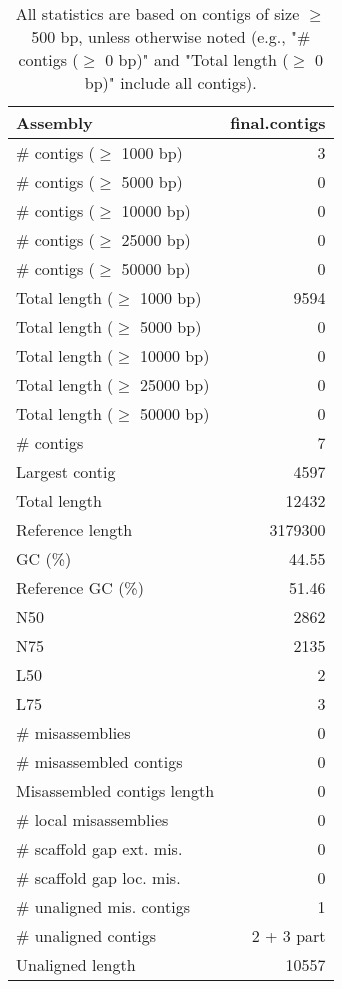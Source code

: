 \documentclass[12pt,a4paper]{article}
\begin{document}
\begin{table}[ht]
\begin{center}
\caption{All statistics are based on contigs of size $\geq$ 500 bp, unless otherwise noted (e.g., "\# contigs ($\geq$ 0 bp)" and "Total length ($\geq$ 0 bp)" include all contigs).}
\begin{tabular}{|l*{1}{|r}|}
\hline
Assembly & final.contigs \\ \hline
\# contigs ($\geq$ 1000 bp) & 3 \\ \hline
\# contigs ($\geq$ 5000 bp) & 0 \\ \hline
\# contigs ($\geq$ 10000 bp) & 0 \\ \hline
\# contigs ($\geq$ 25000 bp) & 0 \\ \hline
\# contigs ($\geq$ 50000 bp) & 0 \\ \hline
Total length ($\geq$ 1000 bp) & 9594 \\ \hline
Total length ($\geq$ 5000 bp) & 0 \\ \hline
Total length ($\geq$ 10000 bp) & 0 \\ \hline
Total length ($\geq$ 25000 bp) & 0 \\ \hline
Total length ($\geq$ 50000 bp) & 0 \\ \hline
\# contigs & 7 \\ \hline
Largest contig & 4597 \\ \hline
Total length & 12432 \\ \hline
Reference length & 3179300 \\ \hline
GC (\%) & 44.55 \\ \hline
Reference GC (\%) & 51.46 \\ \hline
N50 & 2862 \\ \hline
N75 & 2135 \\ \hline
L50 & 2 \\ \hline
L75 & 3 \\ \hline
\# misassemblies & 0 \\ \hline
\# misassembled contigs & 0 \\ \hline
Misassembled contigs length & 0 \\ \hline
\# local misassemblies & 0 \\ \hline
\# scaffold gap ext. mis. & 0 \\ \hline
\# scaffold gap loc. mis. & 0 \\ \hline
\# unaligned mis. contigs & 1 \\ \hline
\# unaligned contigs & 2 + 3 part \\ \hline
Unaligned length & 10557 \\ \hline

\end{tabular}
\end{center}
\end{table}
\end{document}
